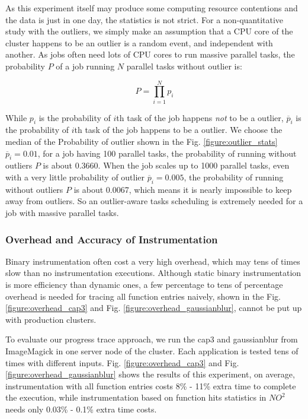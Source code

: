 As this experiment itself may produce some computing resource contentions and the data is just in one day, the statistics is not strict. For a non-quantitative study with the outliers, we simply make an assumption that a CPU core of the cluster happens to be an outlier is a random event, and independent with another. As jobs often need lots of CPU cores to run massive parallel tasks, the probability $P$ of a job running $N$ parallel tasks without outlier is:

$$P = \prod_{i=1}^N p_i$$

While $p_i$ is the probability of $i$th task of the job happens \emph{not} to be a outlier, $\overline{p}_i$ is the probability of $i$th task of the job happens to be a outlier. We choose the median of the Probability of outlier shown in the Fig. \ref{figure:outlier_stats} $\overline{p}_i = 0.01$, for a job having 100 parallel tasks, the probability of running without outliers $P$ is about 0.3660. When the job scales up to 1000 parallel tasks, even with a very little probability of outlier $\overline{p}_i = 0.005$, the probability of running without outliers $P$ is about 0.0067, which means it is nearly impossible to keep away from outliers. So an outlier-aware tasks scheduling is extremely needed for a job with massive parallel tasks.

\subsubsection{Overhead and Accuracy of Instrumentation}

Binary instrumentation often cost a very high overhead, which may tens of times slow than no instrumentation executions. Although static binary instrumentation is more efficiency than dynamic ones, a few percentage to tens of percentage overhead is needed for tracing all function entries naively, shown in the Fig. \ref{figure:overhead_cap3} and Fig. \ref{figure:overhead_gaussianblur}, cannot be put up with production clusters.

To evaluate our progress trace approach, we run the cap3 and gaussianblur from ImageMagick in one server node of the cluster. Each application is tested tens of times with different inputs. Fig. \ref{figure:overhead_cap3} and Fig. \ref{figure:overhead_gaussianblur} shows the results of this experiment, on average, instrumentation with all function entries costs 8\% - 11\% extra time to complete the execution, while instrumentation based on function hits statistics in $NO^2$ needs only 0.03\% - 0.1\% extra time costs.

